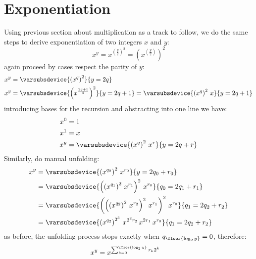 \section{Exponentiation}

Using previous section about multiplication as a track to follow, 
we do the same steps to derive exponentiation of two integers $x$ and $y$:
\begin{displaymath}
    x^{y} = x^{\left(\frac{y}{2}\right)^{2}} = \left(x^{\left(\frac{y}{2}\right)}\right)^{2} 
\end{displaymath}
again proceed by cases respect the parity of $y$:
\begin{displaymath}
    \begin{split}
        x^{y} &= \varsubsdevice{\left(x^{q}\right)^{2}}{y=2q}\\
        x^{y} &= \varsubsdevice{\left(x^{\frac{2q+1}{2}}\right)^{2}}{y=2q+1}
               = \varsubsdevice{\left(x^{q}\right)^{2}\,x}{y=2q+1}\\
    \end{split}
\end{displaymath}
introducing bases for the recursion and abstracting into one line we have:
\begin{displaymath}
    \begin{split}
        x^{0} &= 1\\
        x^{1} &= x\\
        x^{y} &= \varsubsdevice{\left(x^{q}\right)^{2}\,x^{r}}{y=2q+r}\\
    \end{split}
\end{displaymath}
Similarly, do manual unfolding:
\begin{displaymath}
    \begin{split}
        x^{y} &= \varsubsdevice{\left(x^{q_{0}}\right)^{2}\,x^{r_{0}}}{y=2q_{0}+r_{0}}\\
              &= \varsubsdevice{\left(\left(x^{q_{1}}\right)^{2}\,x^{r_{1}}\right)^{2}\,x^{r_{0}}}{q_{0}=2q_{1}+r_{1}}\\
              &= \varsubsdevice{\left(\left(\left(x^{q_{2}}\right)^{2}\,x^{r_{2}}\right)^{2}\,x^{r_{1}} \right)^{2}\,x^{r_{0}}}
                    {q_{1}=2q_{2}+r_{2}}\\
              &= \varsubsdevice{\left(x^{q_{2}}\right)^{2^{3}}\,x^{2^{2}r_{2}}\,x^{2r_{1}}\,x^{r_{0}}}{q_{1}=2q_{2}+r_{2}}\\
    \end{split}
\end{displaymath}
as before, the unfolding process stops exactly when $q_{\floor{\log_{2}{y}}}=0$, therefore:
\begin{align}
    x^{y} &= x^{\sum_{k=0}^{\floor{\log_{2}{y}}}{r_{k}2^{k}}}
\end{align}
